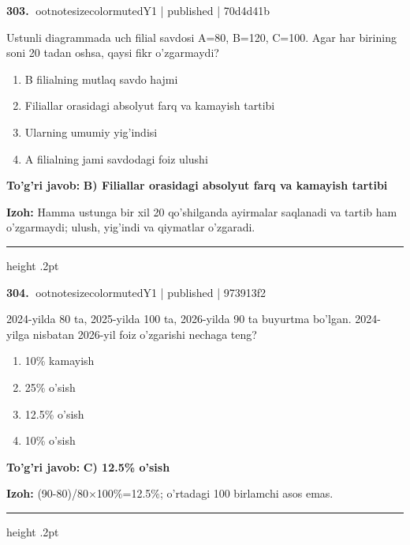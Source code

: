 \documentclass[10pt,a4paper]{article}
\begin{document}
\textbf{\color{ink}303.} {ootnotesizecolor{muted}Y1 | published | 70d4d41b}
\par
Ustunli diagrammada uch filial savdosi A=80, B=120, C=100. Agar har birining soni 20 tadan oshsa, qaysi fikr o'zgarmaydi?
\begin{enumerate}[label=\Alph*),leftmargin=9mm]
\item B filialning mutlaq savdo hajmi
\item Filiallar orasidagi absolyut farq va kamayish tartibi
\item Ularning umumiy yig'indisi
\item A filialning jami savdodagi foiz ulushi
\end{enumerate}
\begin{tcolorbox}[enhanced,breakable,colback=teal!4,colframe=teal!55!black,boxrule=0.45pt,arc=1.2mm,left=2.8mm,right=2.8mm,top=2mm,bottom=2mm]
\textbf{\color{teal}To'g'ri javob:} \textbf{B) Filiallar orasidagi absolyut farq va kamayish tartibi}
\par\smallskip
\textbf{Izoh:} Hamma ustunga bir xil 20 qo'shilganda ayirmalar saqlanadi va tartib ham o'zgarmaydi; ulush, yig'indi va qiymatlar o'zgaradi.
\end{tcolorbox}
\vspace{2mm}\hrule height .2pt\vspace{2mm}

\textbf{\color{ink}304.} {ootnotesizecolor{muted}Y1 | published | 973913f2}
\par
2024-yilda 80 ta, 2025-yilda 100 ta, 2026-yilda 90 ta buyurtma bo'lgan. 2024-yilga nisbatan 2026-yil foiz o'zgarishi nechaga teng?
\begin{enumerate}[label=\Alph*),leftmargin=9mm]
\item 10\% kamayish
\item 25\% o'sish
\item 12.5\% o'sish
\item 10\% o'sish
\end{enumerate}
\begin{tcolorbox}[enhanced,breakable,colback=teal!4,colframe=teal!55!black,boxrule=0.45pt,arc=1.2mm,left=2.8mm,right=2.8mm,top=2mm,bottom=2mm]
\textbf{\color{teal}To'g'ri javob:} \textbf{C) 12.5\% o'sish}
\par\smallskip
\textbf{Izoh:} (90-80)/80\ensuremath{\times}100\%=12.5\%; o'rtadagi 100 birlamchi asos emas.
\end{tcolorbox}
\vspace{2mm}\hrule height .2pt\vspace{2mm}
\end{document}
